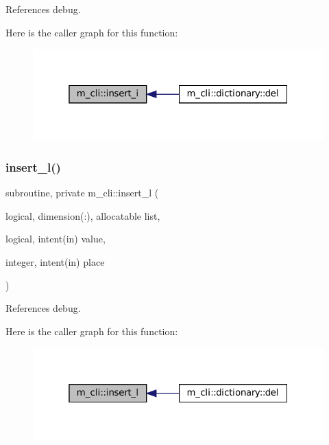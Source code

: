 References debug.

Here is the caller graph for this function\+:\nopagebreak
\begin{figure}[H]
\begin{center}
\leavevmode
\includegraphics[width=319pt]{namespacem__cli_a841685591ef1f1827fc1fe32a7f546f1_icgraph}
\end{center}
\end{figure}
\mbox{\label{namespacem__cli_a0c1b22c46470afbb4ee5c67180335578}} 
\subsubsection{\texorpdfstring{insert\+\_\+l()}{insert\_l()}}
{\footnotesize\ttfamily subroutine, private m\+\_\+cli\+::insert\+\_\+l (\begin{DoxyParamCaption}\item[{logical, dimension(\+:), allocatable}]{list,  }\item[{logical, intent(in)}]{value,  }\item[{integer, intent(in)}]{place }\end{DoxyParamCaption})\hspace{0.3cm}{\ttfamily [private]}}



References debug.

Here is the caller graph for this function\+:\nopagebreak
\begin{figure}[H]
\begin{center}
\leavevmode
\includegraphics[width=319pt]{namespacem__cli_a0c1b22c46470afbb4ee5c67180335578_icgraph}
\end{center}
\end{figure}
\mbox{\label{namespacem__cli_a4bfb90e14824f94017b1d4fcb39f0701}} 
